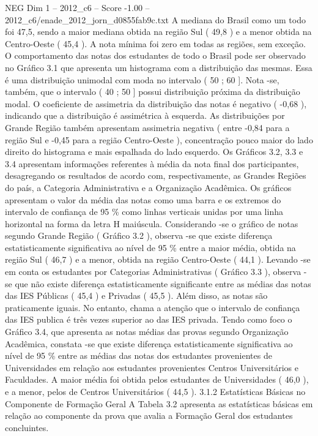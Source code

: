 \begin{textsample}{NEG Dim 1 – 2012\_c6 – Score -1.00 – 2012\_c6/enade\_2012\_jorn\_d0855fab9c.txt}
A mediana do Brasil como um todo foi 47,5, sendo a maior mediana obtida na região Sul ( 49,8 ) e a menor obtida na Centro-Oeste ( 45,4 ).
A nota mínima foi zero em todas as regiões, sem exceção.
O comportamento das notas dos estudantes de todo o Brasil pode ser observado no Gráfico 3.1 que apresenta um histograma com a distribuição das mesmas.
Essa é uma distribuição unimodal com moda no intervalo ( 50 ; 60 ].
Nota -se, também, que o intervalo ( 40 ; 50 ] possui distribuição próxima da distribuição modal.
O coeficiente de assimetria da distribuição das notas é negativo ( -0,68 ), indicando que a distribuição é assimétrica à esquerda.
As distribuições por Grande Região também apresentam assimetria negativa ( entre -0,84 para a região Sul e -0,45 para a região Centro-Oeste ), concentração pouco maior do lado direito do histograma e mais espalhada do lado esquerdo.
Os Gráficos 3.2, 3.3 e 3.4 apresentam informações referentes à média da nota final dos participantes, desagregando os resultados de acordo com, respectivamente, as Grandes Regiões do país, a Categoria Administrativa e a Organização Acadêmica.
Os gráficos apresentam o valor da média das notas como uma barra e os extremos do intervalo de confiança de 95 \% como linhas verticais unidas por uma linha horizontal na forma da letra H maiúscula.
Considerando -se o gráfico de notas segundo Grande Região ( Gráfico 3.2 ), observa -se que existe diferença estatisticamente significativa ao nível de 95 \% entre a maior média, obtida na região Sul ( 46,7 ) e a menor, obtida na região Centro-Oeste ( 44,1 ).
Levando -se em conta os estudantes por Categorias Administrativas ( Gráfico 3.3 ), observa -se que não existe diferença estatisticamente significante entre as médias das notas das IES Públicas ( 45,4 ) e Privadas ( 45,5 ).
Além disso, as notas são praticamente iguais.
No entanto, chama a atenção que o intervalo de confiança das IES publica é três vezes superior ao das IES privada.
Tendo como foco o Gráfico 3.4, que apresenta as notas médias das provas segundo Organização Acadêmica, constata -se que existe diferença estatisticamente significativa ao nível de 95 \% entre as médias das notas dos estudantes provenientes de Universidades em relação aos estudantes provenientes Centros Universitários e Faculdades.
A maior média foi obtida pelos estudantes de Universidades ( 46,0 ), e a menor, pelos de Centros Universitários ( 44,5 ). 3.1.2 Estatísticas Básicas no Componente de Formação Geral A Tabela 3.2 apresenta as estatísticas básicas em relação ao componente da prova que avalia a Formação Geral dos estudantes concluintes.

\end{textsample}
